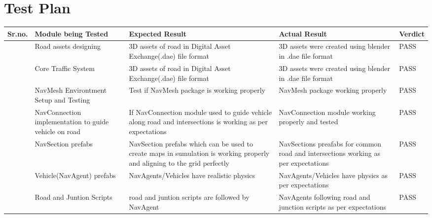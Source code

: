 \documentclass[openany,12pt]{report}
\begin{document}
		\section{Test Plan}
		\begin{longtable}{|p{0.6cm}|p{3.5cm}|p{5cm}|p{3.5cm}|p{1.7cm}|} \hline		
			\textbf{Sr.\newline no.} &\textbf{Module being Tested}	&\textbf{Expected Result}	&\textbf{Actual Result}	&\textbf{Verdict} \\\hline\hline

			\addtocounter{num}{1}
			\thenum&	
			Road assets designing&
			3D assets of road in Digital Asset Exchange(.dae) file format&
			3D assets were created using blender in .dae file format&
			PASS\\\hline
			
			\addtocounter{num}{1}
			\thenum&
			Core Traffic System&
			3D assets of road in Digital Asset Exchange(.dae) file format&
			3D assets were created using blender in .dae file format&
			PASS\\\hline
			
			\addtocounter{num}{1}
			\thenum&
			NavMesh Environtment Setup and Testing&
			Test if NavMesh package is working properly&
			NavMesh package working properly&
			PASS\\\hline			
			
			\addtocounter{num}{1}
			\thenum&
			NavConnection implementation to guide vehicle on road&
			If NavConnection module used to guide vehicle along road and intersections is working as per expectations&
			NavConnection module working properly and tested&
			PASS\\\hline
			
			\addtocounter{num}{1}
			\thenum&
			NavSection prefabs&
			NavSection prefabs which can be used to create maps in sumulation is working properly and aligning to the grid perfectly&
			NavSections preafabs for common road and intersections working as per expectations&
			PASS\\\hline
			
			\addtocounter{num}{1}
			\thenum&
			Vehicle(NavAgent) prefabs&
			NavAgents/Vehicles have realistic physics&
			NavAgents/Vehicles have physics as per expectations&
			PASS\\\hline
			
			\addtocounter{num}{1}
			\thenum&
			Road and Juntion Scripts&
			road and juntion scripts are followed by NavAgent&
			NavAgents following road and junction scripts as per expectations&
			PASS\\\hline
			

\end{longtable}
\end{document}
